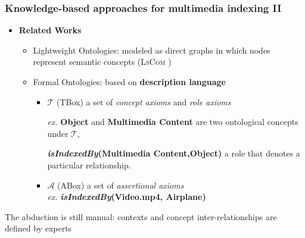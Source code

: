 \begin{frame}
	\frametitle{Knowledge-based approaches for multimedia indexing II}
	
		\begin{itemize}
			\item \textbf{Related Works}
				\begin{itemize}
					\item \alert{Lightweight Ontologies}: modeled as direct graphs in which nodes  
					represent semantic concepts %
					(\textsc{LsCom} {\tiny{\citep{Kennedy2006}}})
					
					\item \alert{Formal Ontologies}: based on \textbf{description language} 
					\\{\tiny{\citep{Mylonas2009,Simou2008,Bannour2014}}}
						\begin{itemize}
						
							\item $\mathcal{T}$ (TBox) a set of \textit{concept axioms} 
										and \textit{role axioms}
		
								\alert{\textit{ex.}} \textbf{Object} and \textbf{Multimedia Content}
								are two ontological concepts under $\mathcal{T}$,
								
								\textbf{\textit{isIndexedBy}(Multimedia Content,Object)} a role that 
								denotes a particular relationship.
							\item $\mathcal{A}$ (ABox) a set of \textit{assertional axioms}
								\\ \alert{\textit{ex.}} \textbf{\textit{isIndexedBy}(Video.mp4, Airplane)}
						\end{itemize}
				\end{itemize}
		\end{itemize}
		\pause
		\begin{alertblock}{}
			\alert{The abduction is still manual: contexts and concept inter-relationships are 
				defined by experts}
		\end{alertblock}
\end{frame}

